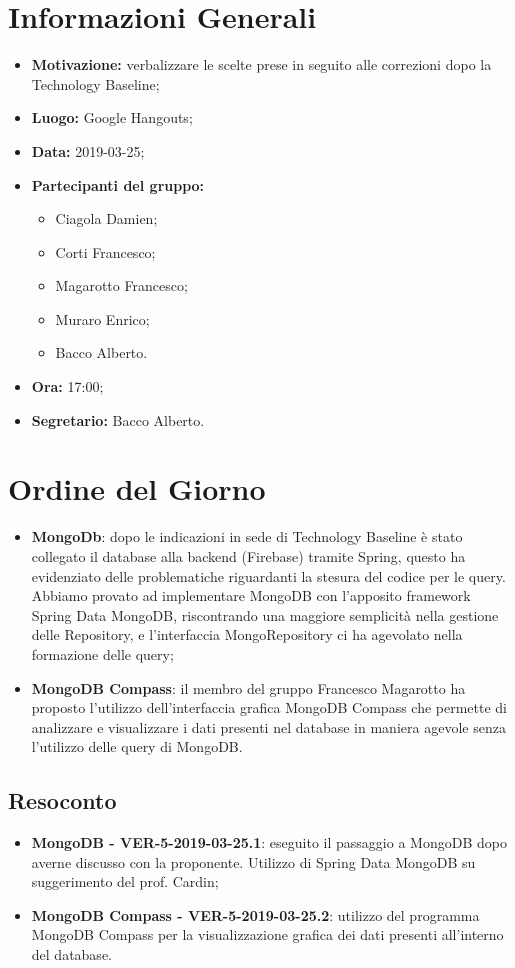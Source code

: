 \documentclass[a4paper, oneside, openany, dvipsnames, table]{article}
\begin{document}
\copertina{}


\newpage
\tableofcontents
\newpage
\section{Informazioni Generali}
\begin{itemize}
\item \textbf{Motivazione:} verbalizzare le scelte prese in seguito alle correzioni dopo la Technology Baseline;
\item \textbf{Luogo:} Google Hangouts;
\item \textbf{Data:} 2019-03-25;
\item \textbf{Partecipanti del gruppo:} \hfill
	\begin{itemize}
		\item Ciagola Damien;
		\item Corti Francesco;
		\item Magarotto Francesco;
		\item Muraro Enrico;
		\item Bacco Alberto.
	\end{itemize} 
\item \textbf{Ora:} 17:00;
\item \textbf{Segretario:} Bacco Alberto.
\end{itemize}

\section{Ordine del Giorno}
\begin{itemize}
	\item \textbf{MongoDb}: 
	dopo le indicazioni in sede di Technology Baseline è stato 
	collegato il database alla backend (Firebase) tramite Spring, questo ha evidenziato delle problematiche riguardanti la stesura
	del codice per le query. 
	Abbiamo provato ad implementare MongoDB con l'apposito framework Spring Data MongoDB, riscontrando
	una maggiore semplicità nella gestione delle Repository, e
	l'interfaccia MongoRepository ci ha agevolato nella 
	formazione delle query;
	\item \textbf{MongoDB Compass}: il membro del gruppo Francesco Magarotto ha proposto l'utilizzo dell'interfaccia grafica MongoDB Compass che permette di analizzare e visualizzare  i dati presenti nel database in maniera agevole senza l'utilizzo delle query di MongoDB. 
\end{itemize}

\subsection{Resoconto}
\begin{itemize}
	\item \textbf{MongoDB - VER-5-2019-03-25.1}: 
	eseguito il passaggio a MongoDB dopo averne discusso con la 
	proponente. Utilizzo di Spring Data MongoDB su suggerimento del prof. Cardin;
	\item \textbf{MongoDB Compass - VER-5-2019-03-25.2}:
	utilizzo del programma MongoDB Compass per la visualizzazione grafica dei dati presenti all'interno del database.
	
	
\end{itemize}
\end{document}
